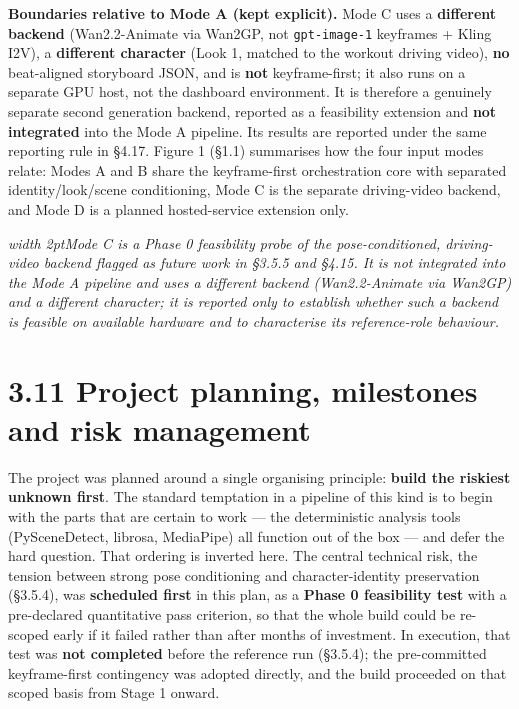 \documentclass[10pt,twocolumn,letterpaper]{article}
\newenvironment{quotebox}%
 {\par\vspace{3pt}\noindent\begin{list}{}{\setlength{\leftmargin}{1em}\setlength{\rightmargin}{0.5em}}\item\footnotesize\itshape\color{black!80}\hspace*{-0.6em}\vrule width 2pt\hspace{0.6em}\ignorespaces}%
 {\end{list}\vspace{3pt}}
\begin{document}
\textbf{Boundaries relative to Mode A (kept explicit).} Mode C uses a \textbf{different backend} (Wan2.2-Animate via Wan2GP, not \texttt{gpt-image-1} keyframes + Kling I2V), a \textbf{different character} (Look 1, matched to the workout driving video), \textbf{no} beat-aligned storyboard JSON, and is \textbf{not} keyframe-first; it also runs on a separate GPU host, not the dashboard environment. It is therefore a genuinely separate second generation backend, reported as a feasibility extension and \textbf{not integrated} into the Mode A pipeline. Its results are reported under the same reporting rule in \S{}4.17. Figure 1 (\S{}1.1) summarises how the four input modes relate: Modes A and B share the keyframe-first orchestration core with separated identity/look/scene conditioning, Mode C is the separate driving-video backend, and Mode D is a planned hosted-service extension only.

\begin{quotebox}Mode C is a Phase 0 feasibility probe of the pose-conditioned, driving-video backend flagged as future work in \S{}3.5.5 and \S{}4.15. It is not integrated into the Mode A pipeline and uses a different backend (Wan2.2-Animate via Wan2GP) and a different character; it is reported only to establish whether such a backend is feasible on available hardware and to characterise its reference-role behaviour.\end{quotebox}


\section*{3.11 Project planning, milestones and risk management}

The project was planned around a single organising principle: \textbf{build the riskiest unknown first}. The standard temptation in a pipeline of this kind is to begin with the parts that are certain to work --- the deterministic analysis tools (PySceneDetect, librosa, MediaPipe) all function out of the box --- and defer the hard question. That ordering is inverted here. The central technical risk, the tension between strong pose conditioning and character-identity preservation (\S{}3.5.4), was \textbf{scheduled first} in this plan, as a \textbf{Phase 0 feasibility test} with a pre-declared quantitative pass criterion, so that the whole build could be re-scoped early if it failed rather than after months of investment. In execution, that test was \textbf{not completed} before the reference run (\S{}3.5.4); the pre-committed keyframe-first contingency was adopted directly, and the build proceeded on that scoped basis from Stage 1 onward.
\end{document}

